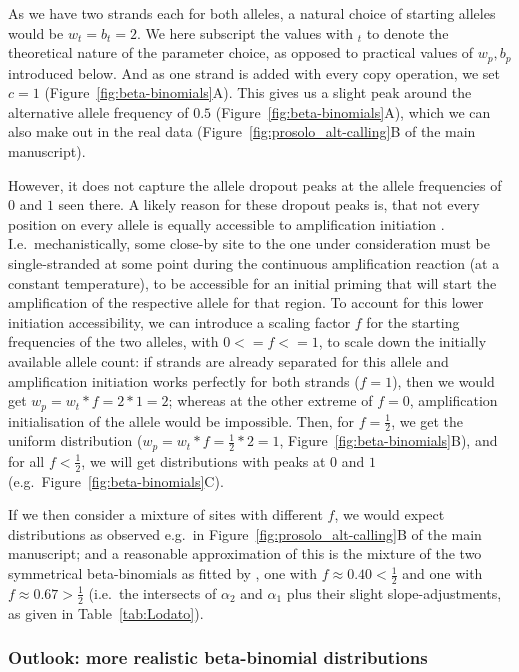 \documentclass[authoryear,preprint,11pt]{scrartcl}
\begin{document}
As we have two strands each for both alleles, a natural choice of starting alleles would be $w_t = b_t = 2$.
We here subscript the values with $_t$ to denote the theoretical nature of the parameter choice, as opposed to practical values of $w_p,b_p$ introduced below.
And as one strand is added with every copy operation, we set $c = 1$ (Figure~\ref{fig:beta-binomials}A).
This gives us a slight peak around the alternative allele frequency of $0.5$ (Figure~\ref{fig:beta-binomials}A), which we can also make out in the real data (Figure~\ref{fig:prosolo_alt-calling}B of the main manuscript).

However, it does not capture the allele dropout peaks at the allele frequencies of $0$ and $1$ seen there.
A likely reason for these dropout peaks is, that not every position on every allele is equally accessible to amplification initiation \citep{picher_trueprime_2016}.
I.e.~mechanistically, some close-by site to the one under consideration must be single-stranded at some point during the continuous amplification reaction (at a constant temperature), to be accessible for an initial priming that will start the amplification of the respective allele for that region.
To account for this lower initiation accessibility, we can introduce a scaling factor $f$ for the starting frequencies of the two alleles, with $0 <= f <= 1$, to scale down the initially available allele count:
if strands are already separated for this allele and amplification initiation works perfectly for both strands ($f = 1$), then we would get $w_p = w_t * f = 2 * 1 = 2$;
whereas at the other extreme of $f = 0$, amplification initialisation of the allele would be impossible.
Then, for $f = \frac{1}{2}$, we get the uniform distribution ($w_p = w_t * f = \frac{1}{2} * 2 = 1$, Figure~\ref{fig:beta-binomials}B), and for all $f < \frac{1}{2}$, we will get distributions with peaks at $0$ and $1$ (e.g.~Figure~\ref{fig:beta-binomials}C).

If we then consider a mixture of sites with different $f$, we would expect distributions as observed e.g.~in Figure~\ref{fig:prosolo_alt-calling}B of the main manuscript; and a reasonable approximation of this is the mixture of the two symmetrical beta-binomials as fitted by \cite{lodato_somatic_2015}, one with $f \approx 0.40 < \frac{1}{2}$ and one with $f \approx 0.67 > \frac{1}{2}$ (i.e.~the intersects of $\alpha_2$ and $\alpha_1$ plus their slight slope-adjustments, as given in Table~\ref{tab:Lodato}).

\subsubsection{Outlook: more realistic beta-binomial distributions} \label{sec:better_beta-binom}
\end{document}
